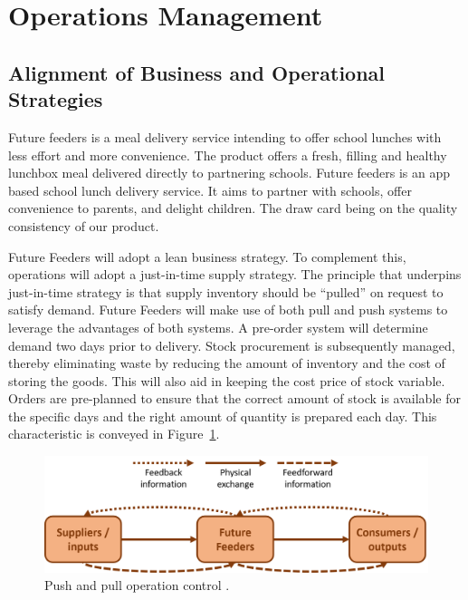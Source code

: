 \section{Operations Management}
\label{sec:ops}
\subsection{Alignment of Business and Operational Strategies}
\label{sec:ops1}
Future feeders is a meal delivery service intending to offer school lunches with less effort and more convenience. The product offers a fresh, filling and healthy lunchbox meal delivered directly to partnering schools. Future feeders is an app based school lunch delivery service. It aims to partner with schools, offer convenience to parents, and delight children. The draw card being on the quality consistency of our product.

Future Feeders will adopt a lean business strategy. To complement this, operations will adopt a just-in-time  supply strategy. The principle that underpins just-in-time strategy is that supply inventory should be ``pulled'' on request to satisfy demand. Future Feeders will make use of both pull and push systems to leverage the advantages of both systems. A pre-order system will determine demand two days prior to delivery. Stock procurement is subsequently managed, thereby eliminating waste by reducing the amount of inventory and the cost of storing the goods. This will also aid in keeping the cost price of stock variable. Orders are pre-planned to ensure that the correct amount of stock is available for the specific days and the right amount of quantity is prepared each day. This characteristic is conveyed in Figure~\ref{fig:transform}.

\begin{figure}[h]
    \centering
    \captionsetup{justification=centering,margin=2cm}
    \includegraphics[width=\textwidth]{op_transform.png}
    \caption{Push and pull operation control \protect\cite{ops_book}.}
    \label{fig:transform}
\end{figure}

